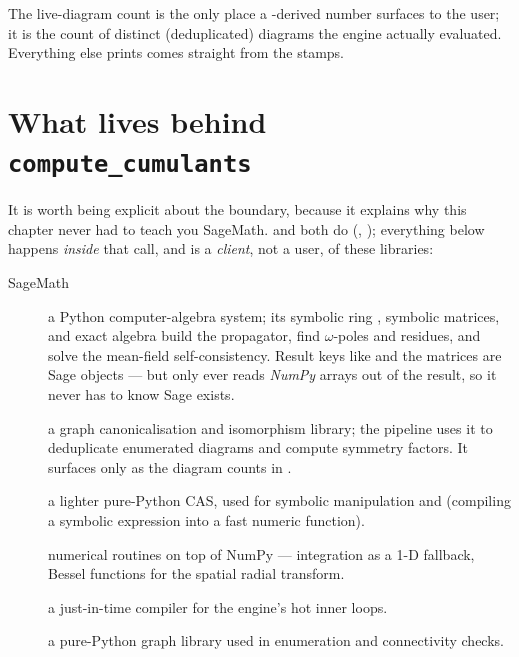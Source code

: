 The live-diagram count is the only place a -derived number surfaces to
the user; it is the count of distinct (deduplicated) diagrams the engine actually
evaluated. Everything else  prints comes straight from the stamps.

\section{What lives behind \texttt{compute\_cumulants}}

It is worth being explicit about the boundary, because it explains why this
chapter never had to teach you SageMath.  and
 both do  (, ); everything
below happens \emph{inside} that call, and  is a \emph{client}, not
a user, of these libraries:

\begin{description}
  \item[SageMath] a Python computer-algebra system; its symbolic ring ,
        symbolic matrices, and exact algebra build the propagator, find
        $\omega$-poles and residues, and solve the mean-field self-consistency.
        Result keys like  and the  matrices are
        Sage objects --- but  only ever reads \emph{NumPy} arrays
        out of the result, so it never has to know Sage exists.
  \item[] a graph canonicalisation and isomorphism library; the
        pipeline uses it to deduplicate enumerated diagrams and compute symmetry
        factors. It surfaces only as the diagram counts in .
  \item[] a lighter pure-Python CAS, used for symbolic manipulation
        and  (compiling a symbolic expression into a fast numeric
        function).
  \item[] numerical routines on top of NumPy --- 
        integration as a 1-D fallback, Bessel functions for the spatial radial
        transform.
  \item[] a just-in-time compiler for the engine's hot inner loops.
  \item[] a pure-Python graph library used in enumeration and
        connectivity checks.
\end{description}

